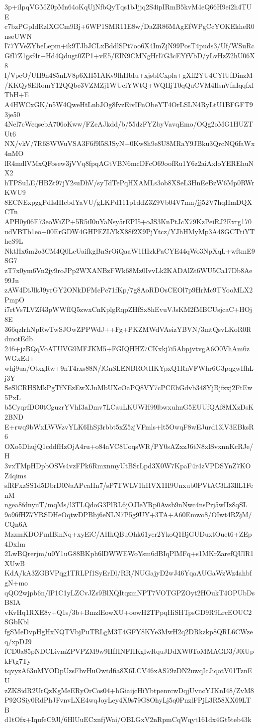 3p+iIpqVGMZ0pMn64oKqUjNfbQyTqs1bJjjq2S4ipIRmB5kvM4eQ66H9ei2h4TUE
c7bzPGpIdRzlXGCm9Bj+6WP1SMR11E8w/DaZR86MAgEfWPgCcYOKEkheR0nseUWN
I77YVeZYbeLepm+ik9TJbJCLxBddlSPt7oo6X4ImZjN99PosT4puds3/Uf/WSuRc
GfI7Z1gsf4r+Hd4Qdugt0ZP1+vE5/EIN9CMNgHrl7G3cEYfVbD/yLvHzZ2hU06X8
I/VpeO/UH9n485nLV8p6XH51AKv9lhHbIu+xjsbICxpla+gXfl2YU4CYlUfDinzM
/KKQy8ERomY12QQbc3VZMZj1WUciYWtQ+WQHjT0qQuCVM4IlsnVfnIqqfxlTbH+E
A4HWCxGK/n5W4QweHtLnbJOg8fvzEivIFnObeYT4OrLSLN4RyLtU1BFGFT93je50
4Nel7cWeqsebA706oKww/FZcAJkdd/b/55dzFYZbyVavqEmo/OQg2oMG1HUZTUt6
NX/vkV/7R6SWWuVSA3F6f9l5SJSyN+0Kw8h9e8U8MRaY9JBku3QrcNQ6faWx4nMO
lR4mdlVMxQFosew3jVVq8fpqAGtVBN6mcDFcO69oofRu1Y6z2aiAxloYEREhuNX2
hTPSuLE/HBZt97jY2suDhV/syTdTePqHXAMLs3ob8XSeL3HnEeBzW6Mp0RWrKWU9
8ECNExpggPdIsHIcbdYaVU/gLKPd111p1ddZ3Z9Vb04V7mn/jj52V7hqHmDQXCTn
APH0y06E73eoWiZP+5R5iI0uYaNsy5rEPI5+oJS3KnPtJcX79KzPeiRJ2Exrg170
udVBTb1eo+00ErGDW4GHPEZLYkX88f2X9PjYtcz/YJhHMyMp3A48GCTtiYTheS9L
NktHx6m2o3CM4Q0LeUaifkgBnSrOiQaaW1HIzkPaCYE44qWo3NpXqL+wftmE9SG7
zT7x0ym6Vn2jy9roJPp2WXANBzFWk68Mz0IvvLk2KADAlZt6WU5Ca17Db8Ae99Jn
zAW4DiJlkJ9yrGY2ONkDFMcPc71fKp/7g8AoRDOsCEOl7p9HrMc9TYooMLX2PmpO
i7rtVs7LVZf43pWWfIQ5zwxCnKplgRqpZHfSx8hEvuVJsKM2fMBCUsjcaC+HOj8E
366qzlrhNpRwTwSJOwZPPWdJ++Fg+PKZMWdVAsizYBVN/3mtQsvLKoR0RdmotEdb
246+jzBQqVoATUVG9MFJKM5+FGIQHHZ7CKxkj7i5AbpjvtvgA6O0VhAm6zWGxEd+
whj9ua/OtxgRw+9nT4rxs88N/lGnSLENBROtHKYpxQ1RnVFWhr6G3pqgwIfhLj3Y
SeSlCRHSMkPgTfNEzEwXJuMbUXcOaPQ8VY7cPCEhGdvb348YjBjfzxj2FtEw5PxL
b5CyqrfDO0tCguzrYVhI3aDmv7LCauLKUWH99lbwxulmG5EUUfQAf8MXzDsK2BND
E+rwq9bWxLWWzvYLK6IhSj3rbbt5xZ5zjVFmls+lt5OwqF8wEJurd13lV3EBksR6
OXo5DhujQ1cddfHzOjA4ru+o84aVC8UoqsWR/PY0sAZxzJ6tN8xlSvxnnKcRJe/H
3vxTMpHDpbOSVs4vzFPk6RmxnmyUtBSrLpd3X0W7KpaF4r4zVPDSYnZ7KOZ4qims
sfRFxzSS1d5DbrD0NaAPcaHn7/sP7TWLV1hHVX1H9Unxub0PVtAC3LI3IlL1FenM
ngea8fdnyuT/mqMs/l3TLQdoG3PlRL6jOJIeYRp0Avsb9nNwc4nsPrj5wIIz8qSL
9o96fHZ7YRSDHeOqtwDPBbj6eNLN7P5g9UY+3TA+A60Emwo8/OIwt4RZjM/CQn6A
MzzmKDOPmIBinNq+xyEiC/AHkQBuOhk61yer2YkoQ1BjGUDuxtOuet6+ZEp4DxIm
2LwBQrerjm/u0Y1uG88BKph6lDWWEWoYsm6dBIqPlMFq+s1MKrZarefQUlR1XUwB
KdA/kA3ZGBVPqg1TRLPf1SyErDl/RR/NUGajyD2wJ46YqaAUGaWzWz4ahbfgN+mo
qQO2wjpb6n/lP1C1yLZCvJZs9BlXQItqzmNPT7VOTGPZOyt2HOukT4OPUbDsB8IA
vKvHq1RXE8y+Q1s/3b+BmzlEowXU+oowH2TPpqHiSHTpsGD9R9LrcEOUC2SGbKbl
fgSMeDvpHgHxNQTVbjPuTRLgM3T4GFY8KYe3MwH2q2DRkzkp8QRL6CWzeq/xpDJ9
fCD0a85pNDCLivmZPVPZM9w9HfHNFHKglwRquJDdXW0ToMMAGD3/J0iUpkFtg7Ty
tqvyzA63uMYODpUzsFbvHuOwtdfia8X6LCV46xAS79zDN2uwqIcJiqotV01TznEU
zZKSidR2UrQzKgMeERyOrCos04+hGiaijcHiYbtpenrcwDqjUvncYJKnI48/ZvM8
P92GSiy0RdPhJFvnvLXE4wqJoyLey4X9s79G8OhyLj5q0PnzlFPjL3R58XX69LTB
d1tOfx+IqufeC9Jl/6HlUuECxnfjWai/OBLGxV2nRpmCqWqyt161dx4Gt5teb43k

